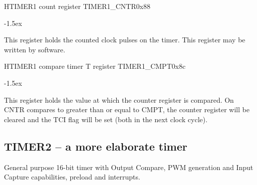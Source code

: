 \documentclass[12pt]{article}
\begin{document}
\begin{register}{H}{TIMER1 count register TIMER1\_CNTR}{0x88}
\label{timer1cntr}
\regnewline%
\end{register}
\begin{regdesc}[0.8\textwidth]\begin{reglist}[00000]
\itemsep-1.5ex
\item[CNTR] This register holds the counted clock pulses on the timer. This register may be written by software.
\end{reglist}\end{regdesc}

\begin{register}{H}{TIMER1 compare timer T register TIMER1\_CMPT}{0x8c}
\label{timer1cmpt}
\regnewline%
\end{register}
\begin{regdesc}[0.8\textwidth]\begin{reglist}[00000]
\itemsep-1.5ex
\item[CMPT] This register holds the value at which the counter register is compared. On CNTR compares to greater than or equal to CMPT, the counter register will be cleared and the TCI flag will be set (both in the next clock cycle).
\end{reglist}\end{regdesc}

\subsection{TIMER2 -- a more elaborate timer}
General purpose 16-bit timer with Output Compare, PWM generation and Input Capture capabilities, preload and interrupts.
\end{document}
